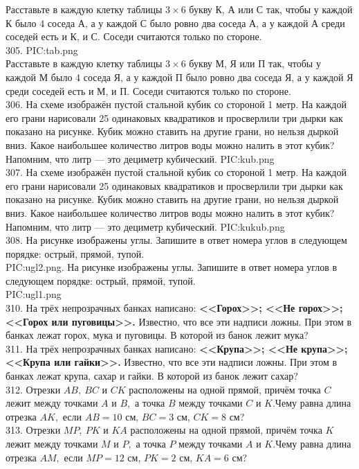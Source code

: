 Расставьте в каждую клетку таблицы $3\times6$ букву К, А или С так, чтобы у каждой К было 4 соседа А, а у каждой С было ровно два соседа А, а у каждой А среди соседей есть и К, и С. Соседи считаются только по стороне.\\
305. {{PIC:tab.png}}\\
Расставьте в каждую клетку таблицы $3\times6$ букву М, Я или П так, чтобы у каждой М было 4 соседа Я, а у каждой П было ровно два соседа Я, а у каждой Я среди соседей есть и М, и П. Соседи считаются только по стороне.\\
306. На схеме изображён пустой стальной кубик со стороной 1 метр. На каждой его грани нарисовали 25 одинаковых квадратиков и просверлили три дырки как показано на рисунке. Кубик можно ставить на другие грани, но нельзя дыркой вниз. Какое наибольшее количество литров воды можно налить в этот кубик? Напомним, что литр --- это дециметр кубический.
{{PIC:kub.png}}\\
307. На схеме изображён пустой стальной кубик со стороной 1 метр. На каждой его грани нарисовали 25 одинаковых квадратиков и просверлили три дырки как показано на рисунке. Кубик можно ставить на другие грани, но нельзя дыркой вниз. Какое наибольшее количество литров воды можно налить в этот кубик? Напомним, что литр --- это дециметр кубический.
{{PIC:kukub.png}}\\
308. На рисунке изображены углы. Запишите в ответ номера углов в следующем порядке: острый, прямой, тупой.\\
{{PIC:ugl2.png}}\newpage{}. На рисунке изображены углы. Запишите в ответ номера углов в следующем порядке: острый, прямой, тупой.\\
{{PIC:ugl1.png}}\\
310. На трёх непрозрачных банках написано: {\bf <<Горох>>; <<Не горох>>; <<Горох или пуговицы>>.} Известно, что все эти надписи ложны. При этом в банках лежат горох, мука и пуговицы. В которой из банок лежит мука?\\
311. На трёх непрозрачных банках написано: {\bf <<Крупа>>; <<Не крупа>>; <<Крупа или гайки>>.} Известно, что все эти надписи ложны. При этом в банках лежат крупа, сахар и гайки. В которой из банок лежит сахар?\\
312. Отрезки $AB,\ BC$ и $CK$ расположены на одной прямой, причём точка $C$ лежит между точками $A$ и $B,$ а точка $B$ между точками $C$ и $K.$Чему равна длина отрезка $AK,$ если $AB=10$ см, $BC=3$ см, $CK=8$ см?\\
313. Отрезки $MP,\ PK$ и $KA$ расположены на одной прямой, причём точка $K$ лежит между точками $M$ и $P,$ а точка $P$ между точками $A$ и $K.$Чему равна длина отрезка $AM,$ если $MP=12$ см, $PK=2$ см, $KA=6$ см?\\
